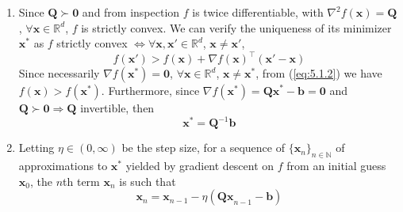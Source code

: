\documentclass{article}
\numberwithin{equation}{section}
\begin{document}
\begin{enumerate}[label=\alph*.]
    \item
    Since $ \mathbf{Q} \succ \mathbf{0} $ and from inspection $ f $ is twice
    differentiable, with $ \nabla^2f(\mathbf{x}) = \mathbf{Q} $,
    $ \forall \mathbf{x} \in \mathbb{R}^d $, $ f $ is strictly convex. We can
    verify the uniqueness of its minimizer $ \mathbf{x}^* $ as $ f $ strictly
    convex $\Leftrightarrow \forall \mathbf{x}, \mathbf{x}' \in
    \mathbb{R}^d $, $ \mathbf{x} \ne \mathbf{x}' $,
    \begin{equation} \label{eq:5.1.2}
        f(\mathbf{x}') >
        f(\mathbf{x}) + \nabla f(\mathbf{x})^\top(\mathbf{x}' - \mathbf{x})
    \end{equation}
    Since necessarily $ \nabla f(\mathbf{x}^*) = \mathbf{0} $,
    $ \forall \mathbf{x} \in \mathbb{R}^d $, $ \mathbf{x} \ne \mathbf{x}^* $,
    from (\ref{eq:5.1.2}) we have $ f(\mathbf{x}) > f(\mathbf{x}^*) $.
    Furthermore, since $ \nabla f(\mathbf{x}^*) = \mathbf{Qx}^* - \mathbf{b} =
    \mathbf{0} $ and $ \mathbf{Q} \succ \mathbf{0} \Rightarrow \mathbf{Q} $
    invertible, then
    \begin{equation} \label{eq:5.1.3}
        \mathbf{x}^* = \mathbf{Q}^{-1}\mathbf{b}
    \end{equation}

    \item
    Letting $ \eta \in (0, \infty) $ be the step size, for a sequence of
    $ \{\mathbf{x}_n\}_{n \in \mathbb{N}} $ of approximations to
    $ \mathbf{x}^* $ yielded by gradient descent on $ f $ from an initial
    guess $ \mathbf{x}_0 $, the $ n $th term $ \mathbf{x}_n $ is such that
    \begin{equation} \label{eq:5.1.4}
        \mathbf{x}_n =
        \mathbf{x}_{n - 1} - \eta(\mathbf{Qx}_{n - 1} - \mathbf{b})
    \end{equation}


\end{enumerate}
\end{document}
